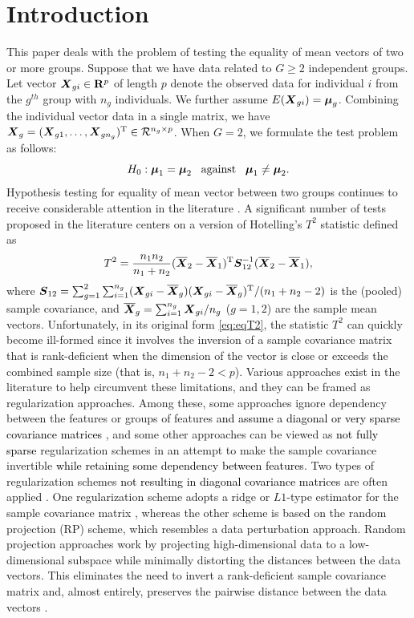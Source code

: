 \documentclass[pdflatex,sn-basic]{sn-jnl}%
\def\be{\begin{eqnarray}}
\def\ee{\end{eqnarray}}
\def\trans{^{\rm T}}
\newcommand{\uS}       {\mbox{\boldmath$S$}}
\newcommand{\uX}       {\mbox{\boldmath$X$}}
\newcommand{\umu}               {\mbox{\boldmath$\mu$}}
\theoremstyle{thmstyleone}%
\theoremstyle{thmstyletwo}%
\theoremstyle{thmstylethree}%
\begin{document}
\section{Introduction}\label{sec:intro}

This paper deals with the problem of testing the equality of mean vectors of two or more groups. Suppose that we have data related to $G \geq 2$ independent groups. Let vector $\uX_{gi} \in \mathbf{R}^{p}$ of length $p$ denote the observed data for individual $i$ from the $g^{th}$ group with $n_{g}$ individuals. We further assume $E(\uX_{gi}) = \umu_g$.  
Combining the individual vector data in a single matrix, we have $\uX_{g} = (\uX_{g1}, \ldots, \uX_{gn_g})\trans \in \mathcal{R}^{n_g \times p}$. When $G=2$, we formulate the test problem as follows:
$$ H_{0}: \umu_1 = \umu_2\;\;\;\mbox{against}\;\;\;  \umu_1 \neq \umu_2.  $$
Hypothesis testing for equality of mean vector between two groups continues to receive considerable attention in the literature \citep{zhang2019more,chen2019two}. A significant number of tests proposed in the literature centers on a version of Hotelling's $T^2$ statistic defined as
\be
T^{2} = \frac{n_1n_2}{n_1 + n_2}(\overline{\uX}_2 - \overline{\uX}_1)\trans\uS^{-1}_{12} (\overline{\uX}_2 - \overline{\uX}_1), \label{eq:eqT2}
\ee
where $\uS_{12} = \sum^{2}_{g=1}\sum^{n_g}_{i=1}(\uX_{gi} - \overline{\uX}_g)(\uX_{gi} - \overline{\uX}_g)\trans /(n_1+n_2 - 2)$ is the (pooled) sample covariance, and $\overline{\uX}_g = \sum^{n_g}_{i=1}\uX_{gi}/n_g$ ($g = 1,2$) are the sample mean vectors.
Unfortunately, in its original form \eqref{eq:eqT2}, the statistic $T^2$ can quickly become ill-formed since it involves the inversion of a sample covariance matrix that is rank-deficient when the dimension of the vector is close or exceeds the combined sample size (that is, $n_1+n_2-2 < p$). Various approaches exist in the literature to help circumvent these limitations, and they can be framed as regularization approaches. Among these, some approaches ignore dependency between the features or groups of features \textcolor{black}{and assume a diagonal or very sparse covariance matrices} \citep{bai1996effect,chen2010two,ahmad2014u,feng2017composite}, and some other approaches can be viewed as \textcolor{black}{not fully sparse} regularization schemes in an attempt to make the sample covariance invertible \textcolor{black}{while retaining some dependency between features}. Two types of regularization schemes \textcolor{black}{not resulting in diagonal covariance matrices} are often applied \citep{hu2020pairwise}. One regularization scheme adopts a ridge or $L1$-type estimator for the sample covariance matrix \citep{chen2011regularized,li2020adaptable}, whereas the other scheme is based on the random projection (RP) scheme, which resembles a data perturbation approach. Random projection approaches work by projecting high-dimensional data to a low-dimensional subspace while minimally distorting the distances between the data vectors. This eliminates the need to invert a rank-deficient sample covariance matrix and, almost entirely, preserves the pairwise distance between the data vectors \citep{johnson84extensionslipschitz}. 
\end{document}
